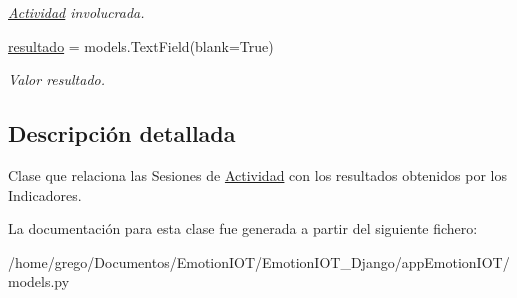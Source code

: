 \begin{DoxyCompactItemize}
\begin{DoxyCompactList}\small\item\em \hyperlink{classappEmotionIOT_1_1models_1_1Actividad}{Actividad} involucrada. \end{DoxyCompactList}\item 
\hyperlink{classappEmotionIOT_1_1models_1_1Resultado__Sesion_a6f900bf09e7675c9aa9ce1913a0d9db5}{resultado} = models.\+Text\+Field(blank=True)\hypertarget{classappEmotionIOT_1_1models_1_1Resultado__Sesion_a6f900bf09e7675c9aa9ce1913a0d9db5}{}\label{classappEmotionIOT_1_1models_1_1Resultado__Sesion_a6f900bf09e7675c9aa9ce1913a0d9db5}

\begin{DoxyCompactList}\small\item\em Valor resultado. \end{DoxyCompactList}\end{DoxyCompactItemize}


\subsection{Descripción detallada}
Clase que relaciona las Sesiones de \hyperlink{classappEmotionIOT_1_1models_1_1Actividad}{Actividad} con los resultados obtenidos por los Indicadores. 

La documentación para esta clase fue generada a partir del siguiente fichero\+:\begin{DoxyCompactItemize}
\item 
/home/grego/\+Documentos/\+Emotion\+I\+O\+T/\+Emotion\+I\+O\+T\+\_\+\+Django/app\+Emotion\+I\+O\+T/models.\+py\end{DoxyCompactItemize}

